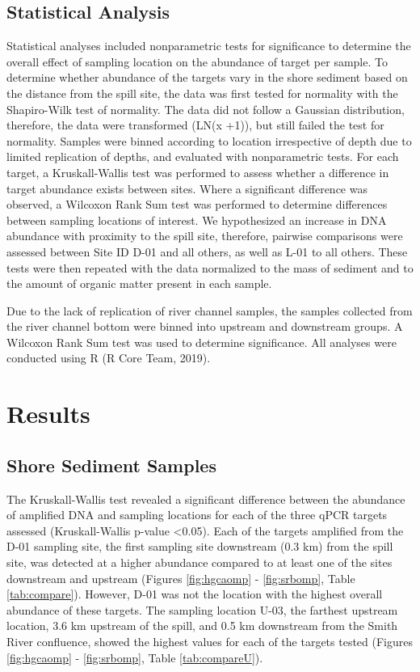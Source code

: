 \documentclass[ms, hidelinks]{uncgdissertationexp3}
\theoremstyle{plain}
\theoremstyle{definition}
\theoremstyle{remark}
\begin{document}
\subsection{Statistical Analysis}\label{statistical-analysis}
Statistical analyses included nonparametric tests for significance to determine the overall effect of sampling location on the abundance of target per sample. To determine whether abundance of the targets vary in the shore sediment based on the distance from the spill site, the data was first tested for normality with the Shapiro-Wilk test of normality. The data did not follow a Gaussian distribution, therefore, the data were transformed (LN(x +1)), but still failed the test for normality. Samples were binned according to location irrespective of depth due to limited replication of depths, and evaluated with nonparametric tests. For each target, a Kruskall-Wallis test was performed to assess whether a difference in target abundance exists between sites. Where a significant difference was observed, a Wilcoxon Rank Sum test was performed to determine differences between sampling locations of interest. We hypothesized an increase in DNA abundance with proximity to the spill site, therefore, pairwise comparisons were assessed between Site ID D-01 and all others, as well as L-01 to all others. These tests were then repeated with the data normalized to the mass of sediment and to the amount of organic matter present in each sample.

Due to the lack of replication of river channel samples, the samples collected from the river channel bottom were binned into upstream and downstream groups. A Wilcoxon Rank Sum test was used to determine significance. All analyses were conducted using R (R Core Team, 2019).

\section{Results}\label{results}
\subsection{Shore Sediment Samples}\label{shore-sediment-samples}

The Kruskall-Wallis test revealed a significant difference between the abundance of amplified DNA and sampling locations for each of the three qPCR targets assessed (Kruskall-Wallis p-value \textless0.05). Each of the targets amplified from the D-01 sampling site, the first sampling site downstream (0.3 km) from the spill site, was detected at a higher abundance compared to at least one of the sites downstream and upstream (Figures \ref{fig:hgcaomp} - \ref{fig:srbomp}, Table \ref{tab:compare}). However, D-01 was not the location with the highest overall abundance of these targets. The sampling location U-03, the farthest upstream location, 3.6 km upstream of the spill, and 0.5 km downstream from the Smith River confluence, showed the highest values for each of the targets tested (Figures \ref{fig:hgcaomp} - \ref{fig:srbomp}, Table \ref{tab:compareU}).
\end{document}
